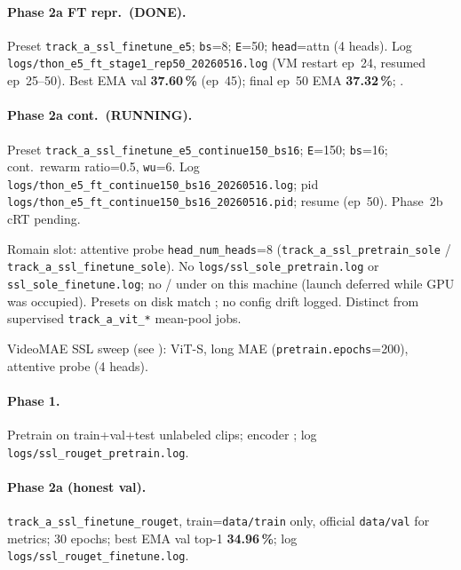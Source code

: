 \begin{table}[ht]
\begin{minipage}{\linewidth}
\begin{description}[leftmargin=1.5em, style=nextline]
  \paragraph{Phase 2a FT repr.\ (DONE).}
  Preset \texttt{track\_a\_ssl\_finetune\_e5}; \texttt{bs}=8; \texttt{E}=50;
  \texttt{head}=attn (4 heads).  Log
  \texttt{logs/thon\_e5\_ft\_stage1\_rep50\_20260516.log} (VM restart ep~24,
  resumed ep~25--50).  Best EMA val \textbf{37.60\,\%} (ep~45);
  final ep~50 EMA \textbf{37.32\,\%}; .
  \paragraph{Phase 2a cont.\ (RUNNING).}
  Preset \texttt{track\_a\_ssl\_finetune\_e5\_continue150\_bs16};
  \texttt{E}=150; \texttt{bs}=16; cont.\ rewarm ratio=0.5, \texttt{wu}=6.
  Log \texttt{logs/thon\_e5\_ft\_continue150\_bs16\_20260516.log};
  pid \texttt{logs/thon\_e5\_ft\_continue150\_bs16\_20260516.pid};
  resume  (ep~50).  Phase~2b cRT pending.
  \item[\textbf{SSL slot 13 / sole} (NOT RUN --- this host)]
  Romain slot: attentive probe \texttt{head\_num\_heads}=8
  (\texttt{track\_a\_ssl\_pretrain\_sole} /
  \texttt{track\_a\_ssl\_finetune\_sole}).  No
  \texttt{logs/ssl\_sole\_pretrain.log} or \texttt{ssl\_sole\_finetune.log};
  no  /  under
   on this machine (launch deferred while
  GPU was occupied).  Presets on disk match ; no config drift
  logged.  Distinct from supervised \texttt{track\_a\_vit\_*} mean-pool jobs.
\item[\textbf{SSL slot 11 / rouget} (DONE)]
  VideoMAE SSL sweep (see ): ViT-S, long MAE
  (\texttt{pretrain.epochs}=200), attentive probe (4 heads).
  \paragraph{Phase 1.} Pretrain on train+val+test unlabeled clips;
  encoder ;
  log \texttt{logs/ssl\_rouget\_pretrain.log}.
  \paragraph{Phase 2a (honest val).} \texttt{track\_a\_ssl\_finetune\_rouget},
  train=\texttt{data/train} only, official \texttt{data/val} for metrics;
  30 epochs; best EMA val top-1 \textbf{34.96\,\%};
  log \texttt{logs/ssl\_rouget\_finetune.log}.

\end{description}
\end{minipage}
\end{table}
